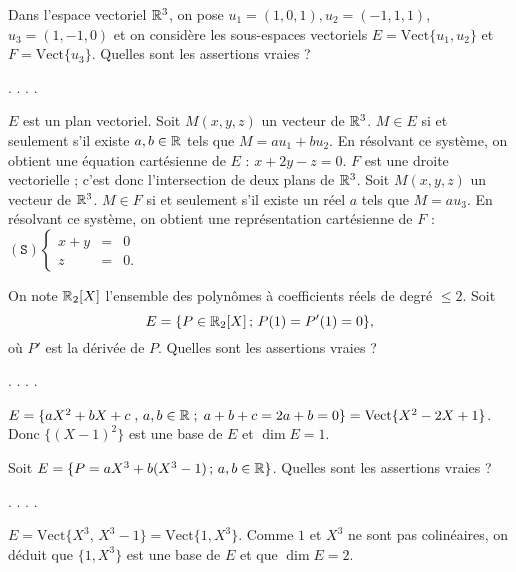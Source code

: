 \begin{question}
Dans l'espace vectoriel $\mathbb{R}^3$, on pose $u_1=(1,0,1), u_2=(-1,1,1)$, $u_3=(1,-1,0)$ et on considère les sous-espaces vectoriels $E=\mbox {Vect}\{u_1,u_2\}$ et $F=\mbox {Vect}\{u_3\}$. Quelles sont les assertions vraies ?
\begin{answers}  
.
.
.
.
\end{answers}
\begin{explanations} $E$ est un plan vectoriel.  
Soit $M(x,y,z)$ un vecteur de $\mathbb{R}^3$. $M \in E$ si et seulement s'il existe $a,b \in \mathbb{R}$ tels que $M=au_1+bu_2$. En résolvant ce système, on obtient une équation cartésienne de $E$ : $x+2y-z=0$.
\vskip2mm
$F$ est une droite vectorielle ; c'est donc l'intersection de deux plans de $\mathbb{R}^3$. Soit $M(x,y,z)$ un vecteur de $\mathbb{R}^3$. $M \in F$ si et seulement s'il existe un réel $a$ tels que $M=au_3$. En 
résolvant ce système, on obtient une représentation cartésienne de $F$ : $(\mathtt{S}) 
\left\{\begin{array}{rcc}x+y&=&0\\
z&=&0.\end{array}\right.$
\end{explanations}
\end{question}

\begin{question}
On note $\mathbb{R}_2[X]$ l'ensemble des polynômes à coefficients réels de degré $\le 2$. Soit 
$$E=\{P \in \mathbb{R}_2[X] \, ; \, P(1)=P'(1)=0\},$$
où $P'$ est la dérivée de $P$. Quelles sont les assertions vraies ?
\begin{answers}  
.
.
.
.
\end{answers}
\begin{explanations} $E=\{aX^2+bX+c \; , \, a,b \in \mathbb{R} \; ; \; a+b+c=2a+b=0\} =\mbox {Vect}\{X^2-2X+1\}$. Donc $\{(X-1)^2\} $ est une base de $E$ et $\dim E = 1$.
\end{explanations}
\end{question}

\begin{question}
Soit $E=\{P= aX^3+b(X^3-1)  \, ; \, a,b \in \mathbb{R}\}$. Quelles sont les assertions vraies ?
\begin{answers}  
.
.
.
.
\end{answers}
\begin{explanations} $E=\mbox{Vect}\{ X^3,\,  X^3-1\}=\mbox {Vect}\{1,X^3\}$. Comme $1$ et $X^3$ ne sont pas colinéaires, on déduit que $\{1,X^3\}$ est une base de $E$ et que $\dim E=2$.
\end{explanations}
\end{question}

